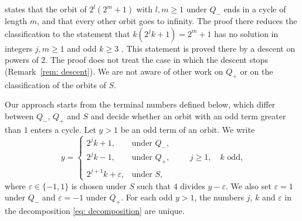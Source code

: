 \documentclass{article}
\newcommand{\Ge}{\geqslant}
\begin{document}
\citet[Theorem~3]{sedaghat2020dual} states that the orbit of $2^l (2^m + 1)$ with $l, m \Ge 1$ under $Q_-$ ends in a cycle of length $m$, and that every other orbit goes to infinity. The proof there reduces the classification to the statement that $k(2^j k + 1) = 2^m + 1$ has no solution in integers $j, m \Ge 1$ and odd $k \Ge 3$ \citep[Lemma~2]{sedaghat2020dual}. This statement is proved there by a descent on powers of $2$. The proof does not treat the case in which the descent stops (Remark~\ref{rem: descent}). We are not aware of other work on $Q_+$ or on the classification of the orbits of $S$.

Our approach starts from the terminal numbers defined below, which differ between $Q_-$, $Q_+$ and $S$ and decide whether an orbit with an odd term greater than $1$ enters a cycle. Let $y > 1$ be an odd term of an orbit. We write
\begin{equation}
    y =
    \begin{cases}
        2^j k + 1 , & \text{under } Q_- , \\
        2^j k - 1 , & \text{under } Q_+ , \\
        2^{j+1} k + \varepsilon , & \text{under } S ,
    \end{cases}
    \qquad j \Ge 1 , \quad k \text{ odd} ,
    \label{eq: decomposition}
\end{equation}
where $\varepsilon \in \{-1, 1\}$ is chosen under $S$ such that $4$ divides $y - \varepsilon$. We also set $\varepsilon = 1$ under $Q_-$ and $\varepsilon = -1$ under $Q_+$. For each odd $y > 1$, the numbers $j$, $k$ and $\varepsilon$ in the decomposition \eqref{eq: decomposition} are unique.
\end{document}
